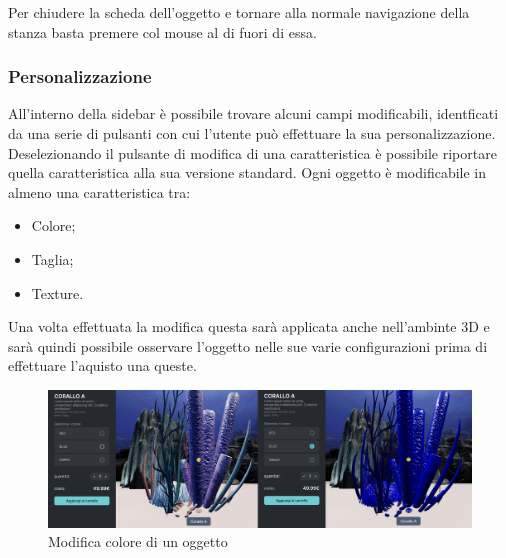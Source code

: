 Per chiudere la scheda dell'oggetto e tornare alla normale navigazione della stanza basta premere col mouse al di fuori di essa.
\subsubsection{Personalizzazione}
All'interno della sidebar è possibile trovare alcuni campi modificabili, identficati da una serie di pulsanti con cui l'utente può effettuare la sua personalizzazione.
Deselezionando il pulsante di modifica di una caratteristica è possibile riportare quella caratteristica alla sua versione standard.
Ogni oggetto è modificabile in almeno una caratteristica tra:
\begin{itemize}
	\item Colore;
	\item Taglia;
	\item Texture.
\end{itemize}
Una volta effettuata la modifica questa sarà applicata anche nell'ambinte 3D e sarà quindi possibile osservare l'oggetto nelle sue varie configurazioni prima di effettuare l'aquisto una queste.
\begin{figure}[H]
  \renewcommand{\thefigure}{6}
\begin{center}
  \includegraphics[width=\linewidth]{./res/images/modifica.png}
\end{center}
  \caption{Modifica colore di un oggetto}
  \label{Modifica colore di un oggetto}
\end{figure}
\pagebreak

